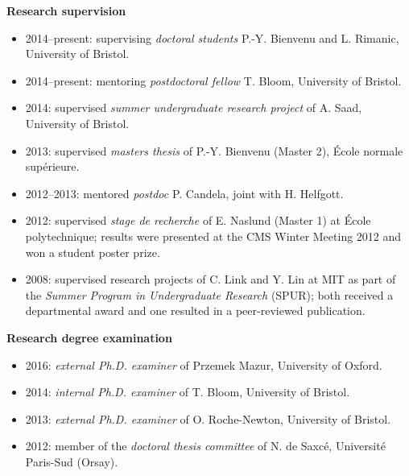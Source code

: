 \documentclass[11pt]{article}
\newenvironment{mitemize}{
\begin{itemize}
  \setlength{\itemsep}{1pt}
  \setlength{\parskip}{0pt}
  \setlength{\parsep}{0pt}
}{\end{itemize}}
\begin{document}
\vspace{3pt}
\textbf{Research supervision}
\begin{mitemize}
\item 2014--present: supervising \textit{doctoral students} P.-Y. Bienvenu and L. Rimanic, University of Bristol.
\item 2014--present: mentoring \textit{postdoctoral fellow} T. Bloom, University of Bristol.
\item 2014: supervised \textit{summer undergraduate research project} of A. Saad, University of Bristol.
\item 2013: supervised \textit{masters thesis} of P.-Y. Bienvenu (Master 2), \'Ecole normale sup\'erieure.
\item 2012--2013: mentored \textit{postdoc} P. Candela, joint with H. Helfgott.
\item 2012: supervised \textit{stage de recherche} of E. Naslund (Master 1) at \'Ecole polytechnique; results were presented at the CMS Winter Meeting 2012 and won a student poster prize.
\item 2008: supervised research projects of C. Link and Y. Lin at MIT as part of the \textit{Summer Program in Undergraduate Research} (SPUR); both received a departmental award and one resulted in a peer-reviewed publication.
\end{mitemize}

\vspace{3pt}
\textbf{Research degree examination}
\begin{mitemize}
\item 2016: \emph{external Ph.D. examiner} of Przemek Mazur, University of Oxford.
\item 2014: \emph{internal Ph.D. examiner} of T. Bloom, University of Bristol.
\item 2013: \emph{external Ph.D. examiner} of O. Roche-Newton, University of Bristol.
\item 2012: member of the \textit{doctoral thesis committee} of N. de Saxc\'e, Universit\'e Paris-Sud (Orsay).
\end{mitemize}
\end{document}

